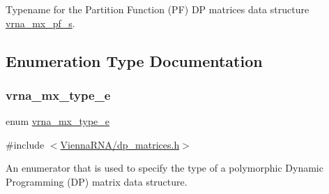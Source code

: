 Typename for the Partition Function (PF) DP matrices data structure \mbox{\hyperlink{group__dp__matrices_structvrna__mx__pf__s}{vrna\+\_\+mx\+\_\+pf\+\_\+s}}. 



\subsection{Enumeration Type Documentation}
\mbox{\label{group__dp__matrices_ga6042ea1d58d01931e959791be6d89343}} 
\subsubsection{\texorpdfstring{vrna\+\_\+mx\+\_\+type\+\_\+e}{vrna\_mx\_type\_e}}
{\footnotesize\ttfamily enum \mbox{\hyperlink{group__dp__matrices_ga6042ea1d58d01931e959791be6d89343}{vrna\+\_\+mx\+\_\+type\+\_\+e}}}



{\ttfamily \#include $<$\mbox{\hyperlink{dp__matrices_8h}{Vienna\+R\+N\+A/dp\+\_\+matrices.\+h}}$>$}



An enumerator that is used to specify the type of a polymorphic Dynamic Programming (DP) matrix data structure. 

